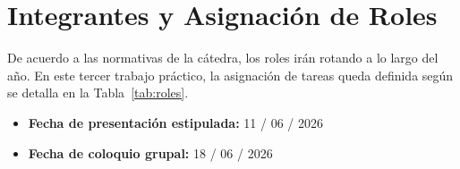 \chapter{Integrantes y Asignación de Roles}
De acuerdo a las normativas de la cátedra, los roles irán rotando a lo largo del año. En este tercer trabajo práctico, la asignación de tareas queda definida según se detalla en la Tabla~\ref{tab:roles}.

\begin{table}[H]
    \centering
    \caption{Tabla de asignación de roles del grupo para el TP3.}
    \label{tab:roles}
\end{table}

\begin{itemize}
    \item \textbf{Fecha de presentación estipulada:} 11 / 06 / 2026
    \item \textbf{Fecha de coloquio grupal:} 18 / 06 / 2026
\end{itemize}
